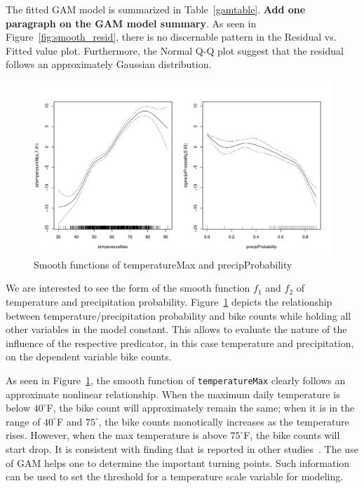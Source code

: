 \documentclass [11pt, proquest] {uwthesis}[2015/03/03]
\begin{document}
The fitted GAM model is summarized in Table~\ref{gamtable}. \textbf{Add one paragraph on the GAM model summary}. As seen in Figure~\ref{fig:smooth_resid}, there is no discernable pattern in the Residual vs. Fitted value plot. Furthermore, the Normal Q-Q plot suggest that the residual follows an approximately Gaussian distribution. 

\begin{figure}
\centering
   \includegraphics[width=1\textwidth]{figures/gam.pdf} 
\vspace{-10pt}
  \caption{Smooth functions of temperatureMax and precipProbability}
  \label{fig:smooth}
\vspace{-1.05cm}
\end{figure}

We are interested to see the form of the smooth function $f_1$ and $f_2$ of temperature and precipitation probability. Figure~\ref{fig:smooth} depicts the relationship between temperature/precipitation probability and bike counts while holding all other variables in the model constant. This allows to evaluate the nature of the influence of the respective predicator, in this case temperature and precipitation, on the dependent variable bike counts. 

As seen in Figure~\ref{fig:smooth}, the smooth function of \texttt{temperatureMax} clearly follows an approximate nonlinear relationship. When the maximum daily temperature is below $40^{\circ}$F, the bike count will approximately remain the same; when it is in the range of $40^{\circ}$F and $75^{\circ}$, the bike counts monotically increases as the temperature rises. However, when the max temperature is above $75^{\circ}$F, the bike counts will start drop. It is consistent with finding that is reported in other studies~\cite{}. The use of GAM helps one to determine the important turning points. Such information can be used to set the threshold for a temperature scale variable for modeling. 
\end{document}
